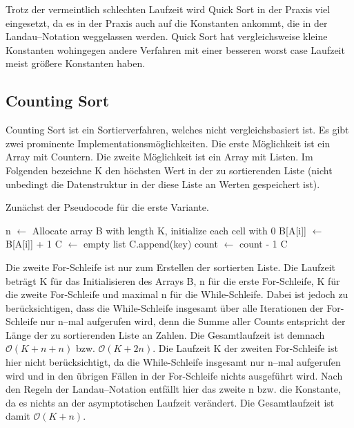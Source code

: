 \documentclass[10pt,a4paper,oneside,ngerman,numbers=noenddot]{scrartcl}
\begin{document}
		Trotz der vermeintlich schlechten Laufzeit wird Quick Sort in der Praxis viel eingesetzt, da es in der Praxis auch auf die Konstanten ankommt, die in der Landau--Notation weggelassen werden. Quick Sort hat vergleichsweise kleine Konstanten wohingegen andere Verfahren mit einer besseren worst case Laufzeit meist größere Konstanten haben.
	
	\subsection{Counting Sort}
	
		Counting Sort ist ein Sortierverfahren, welches nicht vergleichsbasiert ist. Es gibt zwei prominente Implementationsmöglichkeiten. Die erste Möglichkeit ist ein Array mit Countern. Die zweite Möglichkeit ist ein Array mit Listen. Im Folgenden bezeichne K den höchsten Wert in der zu sortierenden Liste (nicht unbedingt die Datenstruktur in der diese Liste an Werten gespeichert ist).
		
		Zunächst der Pseudocode für die erste Variante.
		
		\begin{algorithmic}[1]
				\State n $\gets$ 
				\State Allocate array B with length K, initialize each cell with 0
					\State B[A[i]] $\gets$ B[A[i]] + 1
				\EndFor
				\State C $\gets$ empty list
						\State C.append(key)
						\State count $\gets$ count - 1
					\EndWhile
				\EndFor
				\State \Return C
			\EndFunction
		\end{algorithmic}
		
		Die zweite For-Schleife ist nur zum Erstellen der sortierten Liste. Die Laufzeit beträgt K für das Initialisieren des Arrays B, n für die erste For-Schleife, K für die zweite For-Schleife und maximal n für die While-Schleife. Dabei ist jedoch zu berücksichtigen, dass die While-Schleife insgesamt über alle Iterationen der For-Schleife nur n--mal aufgerufen wird, denn die Summe aller Counts entspricht der Länge der zu sortierenden Liste an Zahlen. Die Gesamtlaufzeit ist demnach $\mathcal{O}(K + n + n)$ bzw. $\mathcal{O}(K + 2n)$. Die Laufzeit K der zweiten For-Schleife ist hier nicht berücksichtigt, da die While-Schleife insgesamt nur n--mal aufgerufen wird und in den übrigen Fällen in der For-Schleife nichts ausgeführt wird. Nach den Regeln der Landau--Notation entfällt hier das zweite n bzw. die Konstante, da es nichts an der asymptotischen Laufzeit verändert. Die Gesamtlaufzeit ist damit $\mathcal{O}(K + n)$.
		
\end{document}
